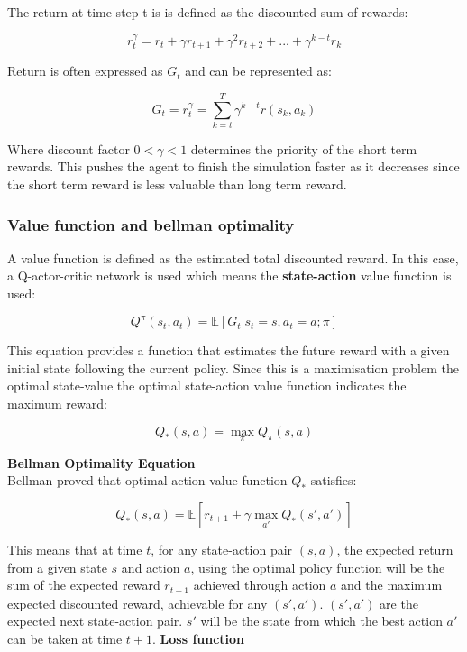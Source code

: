 The return at time step t is is defined as the discounted sum of rewards:

\[r_t^\gamma =  r_t + \gamma r_{t+1} +\gamma^2 r_{t+2} + ... +\gamma^{k-t} r_k\]

\noindent

Return is often expressed as $G_t$ and can be represented as:

\begin{equation}
     G_t = r_t^\gamma = \sum_{k =  t}^T\gamma^{k-t}r(s_k,a_k)
     \label{equ:rew}
\end{equation}

Where discount factor $0< \gamma < 1$  determines the priority of the short term rewards. This  pushes the agent to finish the simulation faster as it decreases since the short term reward is less valuable than long term reward.

\subsubsection{Value function and bellman optimality}
A value function is defined as the estimated total discounted reward. In this case, a Q-actor-critic network is used which means the \textbf{state-action} value function \cite{ac2} is used:


\[Q^{\pi}(s_t,a_t) = \mathbb{E}[G_t | s_t = s, a_t = a;\pi]\]


This equation provides a function that estimates the future reward with a given initial state following the current policy. Since this is a maximisation problem the optimal state-value \cite{bel1} the optimal state-action value function indicates the maximum reward:

\[Q_*(s,a) = \mathop{max}_{\pi}Q_\pi(s,a)\]

\noindent
\textbf{Bellman Optimality Equation}\\


Bellman proved that optimal action value function $Q_*$ satisfies:

\begin{equation}
Q_*(s,a) = \mathbb{E}[r_{t+1} + \gamma\mathop{max}_{a'}Q_*(s',a')]
\label{equ:bel}
\end{equation}

This means that at time $t$, for any state-action pair $(s,a)$, the expected return from a given state $s$ and action $a$, using the optimal policy function will be the sum of the expected reward $r_{t+1}$ achieved through action $a$ and the maximum expected discounted reward, achievable for any $(s',a')$. $(s',a')$ are the expected next state-action pair. $s'$ will be the state from which the best action $a'$ can be taken at time $t+1$.\cite{bel2}\hfill
\newline
\newline
\noindent
\textbf{Loss function}\\


